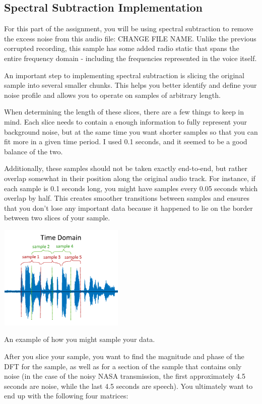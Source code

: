 \documentclass{tufte-handout}
\begin{document}
\subsection{Spectral Subtraction Implementation}
For this part of the assignment, you will be using spectral subtraction to remove the excess noise from this audio file: CHANGE FILE NAME. Unlike the previous corrupted recording, this sample has some added radio static that spans the entire frequency domain - including the frequencies represented in the voice itself.

An important step to implementing spectral subtraction is slicing the original sample into several smaller chunks. This helps you better identify and define your noise profile and allows you to operate on samples of arbitrary length.

When determining the length of these slices, there are a few things to keep in mind. Each slice needs to contain a enough information to fully represent your background noise, but at the same time you want shorter samples so that you can fit more in a given time period. I used 0.1 seconds, and it seemed to be a good balance of the two.

Additionally, these samples should not be taken exactly end-to-end, but rather overlap somewhat in their position along the original audio track. For instance, if each sample is 0.1 seconds long, you might have samples every 0.05 seconds which overlap by half. This creates smoother transitions between samples and ensures that you don't lose any important data because it happened to lie on the border between two slices of your sample.

\begin{marginfigure}
    \centering
    \includegraphics[width = 6cm, height = 5cm]{sample_1.png}
    \label{fig:sample_data_1}
\caption{An example of how you might sample your data.}
\end{marginfigure}

After you slice your sample, you want to find the magnitude and phase of the DFT for the sample, as well as for a section of the sample that contains only noise (in the case of the noisy NASA transmission, the first approximately 4.5 seconds are noise, while the last 4.5 seconds are speech). You ultimately want to end up with the following four matrices:
\end{document}
